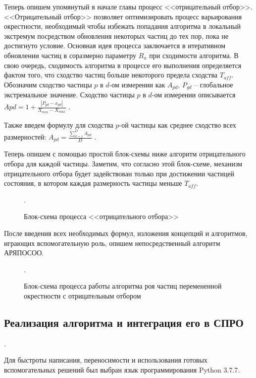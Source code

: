 Теперь опишем упомянутый в начале главы процесс <<отрицательный отбор>>. <<Отрицательный отбор>> позволяет оптимизировать процесс варьирования окрестности, необходимый чтобы избежать попадания алгоритма в локальный экстремум посредством  обновления некоторых частиц до тех пор, пока не достигнуто условие. Основная идея процесса заключается в итеративном обновлении частиц в соразмерно параметру $R_u$ при сходимости алгоритма. В свою очередь, сходимость алгоритма в процессе его выполнения определяется фактом того, что сходство частиц больше некоторого предела сходства $T_{aff}$. Обозначим сходство частицы $p$ в $d$-ом измерении как $A_{pd}$, $P_{gd}$ -- глобальное экстремальное значение.  %
Сходство частицы $p$ в $d$-ом измерении описывается $A{pd} = 1 + \frac{|P_{gd} - x_{pd}|}{X_{min} - X_{max}}$ \cite[с. 520]{Cheng:2017}.

Также введем формулу для сходства $p$-ой частицы как среднее сходство всех размерностей: $A_{pd} =  \frac {\sum_{d=1}^{D} A_{pd}} {D}$ \cite[с. 520]{Cheng:2017}.

Теперь опишем с помощью простой блок-схемы ниже алгоритм отрицательного отбора для каждой частицы. Заметим, что согласно этой блок-схеме, механизм отрицательного отбора будет задействован только при достижении частицей состояния, в котором  каждая  размерность частицы меньше $T_{aff}$.


\begin{figure*}[h!]
	\caption{Блок-схема процесса <<отрицательного отбора>>}.
\end{figure*} 

После введения всех необходимых формул, изложения концепций и алгоритмов, играющих вспомогательную роль, опишем непосредственный алгоритм АРЯПОСОО. 

\begin{figure*}
	\caption{Блок-схема процесса работы алгоритма роя частиц перемененной окрестности с отрицательным отбором}.
\end{figure*} 

\newpage 

\subsection{Реализация алгоритма и интеграция его в СПРО}.

Для быстроты написания, переносимости и использования готовых вспомогательных решений был выбран язык программирования Python 3.7.7. 

